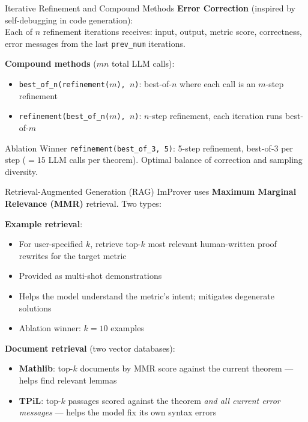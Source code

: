 \begin{frame}{Iterative Refinement and Compound Methods}
\vspace{0.3em}
\textbf{Error Correction} (inspired by self-debugging in code generation):\\[0.3em]
Each of $n$ refinement iterations receives: input, output, metric score, correctness, error messages from the last \texttt{prev\_num} iterations.
\vspace{0.5em}

\textbf{Compound methods} ($mn$ total LLM calls):
\begin{itemize}\setlength{\itemsep}{6pt}
  \item \texttt{best\_of\_n(refinement($m$), $n$)}: best-of-$n$ where each call is an $m$-step refinement
  \item \texttt{refinement(best\_of\_n($m$), $n$)}: $n$-step refinement, each iteration runs best-of-$m$
\end{itemize}
\vspace{0.5em}
\begin{block}{Ablation Winner}
  \texttt{refinement(best\_of\_3, 5)}: 5-step refinement, best-of-3 per step ($= 15$ LLM calls per theorem). Optimal balance of correction and sampling diversity.
\end{block}
\end{frame}

\begin{frame}{Retrieval-Augmented Generation (RAG)}
\vspace{0.4em}
ImProver uses \textbf{Maximum Marginal Relevance (MMR)} retrieval. Two types:
\vspace{0.4em}

\textbf{Example retrieval}:
\begin{itemize}\setlength{\itemsep}{4pt}
  \item For user-specified $k$, retrieve top-$k$ most relevant human-written proof rewrites for the target metric
  \item Provided as multi-shot demonstrations
  \item Helps the model understand the metric's intent; mitigates degenerate solutions
  \item Ablation winner: $k = 10$ examples
\end{itemize}
\vspace{0.4em}

\textbf{Document retrieval} (two vector databases):
\begin{itemize}\setlength{\itemsep}{4pt}
  \item \textbf{Mathlib}: top-$k$ documents by MMR score against the current theorem --- helps find relevant lemmas
  \item \textbf{TPiL}: top-$k$ passages scored against the theorem \emph{and all current error messages} --- helps the model fix its own syntax errors
\end{itemize}
\end{frame}

